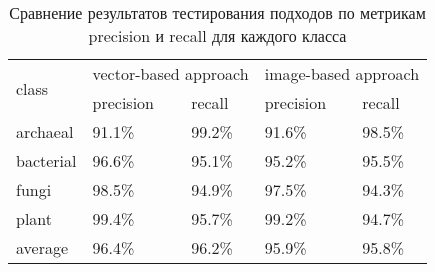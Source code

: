 \begin{table}[h]
\begin{tabular}{|l|l|l|l|l|}
\hline
\multirow{2}{*}{class} & \multicolumn{2}{l|}{vector-based approach} & \multicolumn{2}{l|}{image-based approach} \\ \cline{2-5} 
                       & precision             & recall             & precision             & recall            \\ \hline
archaeal               & 91.1\%                & 99.2\%             & 91.6\%                & 98.5\%            \\ \hline
bacterial              & 96.6\%                & 95.1\%             & 95.2\%                & 95.5\%            \\ \hline
fungi                  & 98.5\%                & 94.9\%             & 97.5\%                & 94.3\%            \\ \hline
plant                  & 99.4\%                & 95.7\%             & 99.2\%                & 94.7\%            \\ \hline
average                  & 96.4\%                & 96.2\%             & 95.9\%                & 95.8\%            \\ \hline
\end{tabular}
\caption{Сравнение результатов тестирования подходов по метрикам precision и recall для каждого класса}
\label{metrics_abfp}
\end{table}